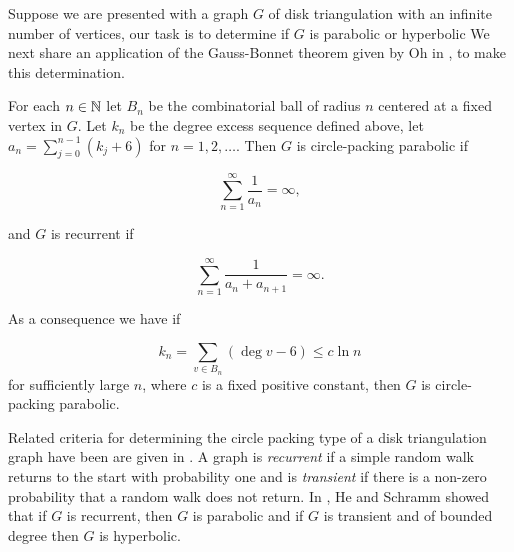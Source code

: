 Suppose we are presented with a graph $G$ of disk triangulation with an infinite 
number of vertices, our task is to determine if $G$ is parabolic or hyperbolic
We next share an application of the Gauss-Bonnet theorem given by Oh in \cite{oh_criteria_2022},
to make this determination.


\begin{theorem}\label{thm:Oh-packing}
For each $n\in\mathbb{N}$ let $B_n$ be the combinatorial ball of radius $n$
centered at a fixed vertex in $G.$ Let $k_n$ be the degree excess sequence
defined above, let $a_n=\sum_{j=0}^{n-1}(k_j+6)$ for $n=1,2,\ldots$.
Then $G$ is circle-packing parabolic if 

\begin{equation}\label{eqn:cp-parabolic}
\sum_{n=1}^{\infty}\frac{1}{a_n}=\infty,
\end{equation}

and $G$ is recurrent if

\begin{equation}\label{eqn:recurrent}
\sum_{n=1}^{\infty}\frac{1}{a_n+a_{n+1}}=\infty.
\end{equation}

\end{theorem}

As a consequence we have if

$$k_n=\sum_{v\in B_n}(\deg v -6)\leq c\ln n$$
for sufficiently large $n$, where $c$ is a fixed positive constant,
then $G$ is circle-packing parabolic.


Related criteria for determining the circle packing type of a disk triangulation graph have been are
given in \cite{he_hyperbolic_1995}.
A graph is \emph{recurrent} if a simple random walk returns to the start with probability one
and is \emph{transient} if there is a non-zero probability that a random walk does not return.
In \cite{he_hyperbolic_1995}, He and Schramm showed that if $G$ is recurrent, then $G$
is parabolic and if $G$ is transient and of bounded degree then $G$ is hyperbolic.

